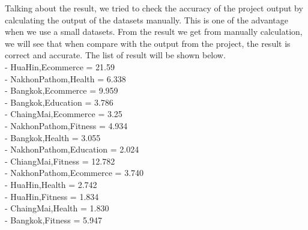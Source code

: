 \documentclass[11pt]{article}
\begin{document}
\newpage
Talking about the result, we tried to check the accuracy of the project output by calculating the output of the datasets manually. This is one of the advantage when we use a small datasets. From the result we get from manually calculation, we will see that when compare with the output from the project, the result is correct and accurate. The list of result will be shown below.\\
- HuaHin,Ecommerce = 21.59\\
- NakhonPathom,Health = 6.338\\
- Bangkok,Ecommerce = 9.959\\
- Bangkok,Education = 3.786\\
- ChaingMai,Ecommerce = 3.25\\
- NakhonPathom,Fitness = 4.934\\
- Bangkok,Health = 3.055\\
- NakhonPathom,Education = 2.024\\
- ChiangMai,Fitness = 12.782\\
- NakhonPathom,Ecommerce = 3.740\\
- HuaHin,Health = 2.742\\
- HuaHin,Fitness = 1.834\\
- ChaingMai,Health = 1.830\\
- Bangkok,Fitness = 5.947
\end{document}
